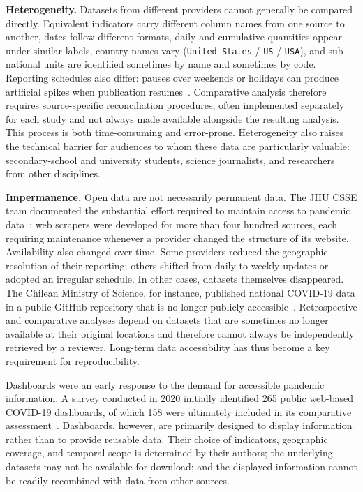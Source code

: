 \documentclass[preprint,12pt,a4paper]{elsarticle}
\begin{document}
\textbf{Heterogeneity.} Datasets from different providers cannot generally be
compared directly. Equivalent indicators carry different column names from one
source to another, dates follow different formats, daily and cumulative
quantities appear under similar labels, country names vary
(\texttt{United States} / \texttt{US} / \texttt{USA}), and sub-national units
are identified sometimes by name and sometimes by code. 
Reporting schedules also differ: pauses over weekends or holidays can produce
artificial spikes when publication resumes~\cite{dong2022}. Comparative analysis therefore requires
source-specific reconciliation procedures, often implemented separately for
each study and not always made available alongside the resulting analysis. This
process is both time-consuming and error-prone. Heterogeneity also raises the
technical barrier for audiences to whom these data are particularly valuable:
secondary-school and university students, science journalists, and researchers
from other disciplines.



\bigskip

\textbf{Impermanence.} Open data are not necessarily permanent data. The JHU
CSSE team documented the substantial effort required to maintain access to
pandemic data~\cite{dong2022}: web scrapers were developed for more than four
hundred sources, each requiring maintenance whenever a provider changed the
structure of its website. Availability also changed over time. Some providers reduced the geographic resolution of their reporting; others
shifted from daily to weekly updates or adopted an irregular schedule. In other cases,
datasets themselves disappeared. The Chilean Ministry of Science, for
instance, published national COVID-19 data in a public GitHub repository that
is no longer publicly accessible~\cite{minciencia}.
Retrospective and comparative analyses depend on datasets that are sometimes
no longer available at their original locations and therefore cannot always be
independently retrieved by a reviewer. Long-term data accessibility has thus
become a key requirement for reproducibility.

\bigskip

Dashboards were an early response to the demand for accessible pandemic
information. A survey conducted in 2020 initially identified 265 public
web-based COVID-19 dashboards, of which 158 were ultimately included in its
comparative assessment~\cite{ivankovic2021}. Dashboards, however, are primarily
designed to display information rather than to provide reusable data. Their
choice of indicators, geographic coverage, and temporal scope is determined by
their authors; the underlying datasets may not be available for download; and
the displayed information cannot be readily recombined with data
from other sources.
\end{document}
